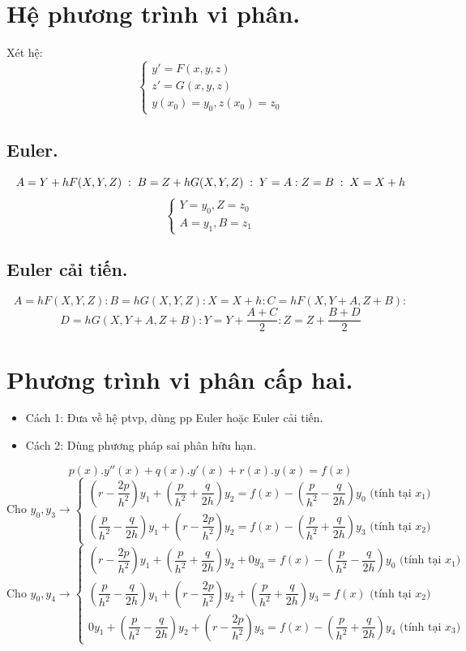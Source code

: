 \documentclass[12pt, a4paper]{report}
\begin{document}
\section{Hệ phương trình vi phân.}
Xét hệ:
\[
    \begin{cases}
        y' = F(x,y,z) \\
        z' = G(x,y,z) \\
        y(x_0) = y_0, z(x_0) = z_0
    \end{cases}    
\]
\subsection{Euler.}
\[
    A = Y + hF(X,Y,Z) \thickspace : \thickspace B = Z + hG(X,Y,Z) \thickspace : \thickspace Y = A : Z = B \thickspace : \thickspace X = X + h 
\]
\[
    \begin{cases}
        Y = y_0, Z = z_0 \\
        A = y_1, B = z_1
    \end{cases}
\]
\subsection{Euler cải tiến.}
\[
    A = hF(X,Y,Z)  :  B = hG(X,Y,Z)  :  X = X + h  :  C = hF(X,Y+A,Z+B) :
\]
\[
    D = hG(X,Y+A,Z+B) : Y = Y + \frac{A+C}{2} : Z = Z + \frac{B+D}{2}
\]
\section{Phương trình vi phân cấp hai.}
\begin{itemize}
    \item Cách 1: Đưa về hệ ptvp, dùng pp Euler hoặc Euler cải tiến.
    \item Cách 2: Dùng phương pháp sai phân hữu hạn.
\end{itemize}
\[
    p(x).y''(x) + q(x).y'(x) + r(x).y(x) = f(x)    
\]
\[
  \text{Cho } y_0, y_3 \longrightarrow  
    \begin{cases}
        \left( r - \dfrac{2p}{h^2} \right)y_1 + \left(\dfrac{p}{h^2} + \dfrac{q}{2h} \right)y_2 = f(x) - \left(\dfrac{p}{h^2} -\dfrac{q}{2h} \right)y_0 \text{ (tính tại } x_1) \\
        \left(\dfrac{p}{h^2} - \dfrac{q}{2h} \right)y_1 + \left( r - \dfrac{2p}{h^2} \right)y_2 = f(x) - \left(\dfrac{p}{h^2} + \dfrac{q}{2h} \right)y_3 \text{ (tính tại } x_2)
    \end{cases}    
\]
\[
    \text{Cho } y_0, y_4 \longrightarrow  
    \begin{cases}
        \left( r - \dfrac{2p}{h^2} \right)y_1 + \left(\dfrac{p}{h^2} + \dfrac{q}{2h} \right)y_2 + 0y_3 = f(x) - \left(\dfrac{p}{h^2} - \dfrac{q}{2h} \right)y_0 \text{ (tính tại } x_1) \\
        \left(\dfrac{p}{h^2} - \dfrac{q}{2h} \right)y_1 + \left( r - \dfrac{2p}{h^2} \right)y_2 + \left(\dfrac{p}{h^2} + \dfrac{q}{2h} \right)y_3 = f(x) \text{ (tính tại } x_2) \\
        0y_1 + \left(\dfrac{p}{h^2} - \dfrac{q}{2h} \right)y_2 + \left( r - \dfrac{2p}{h^2} \right)y_3 = f(x) - \left(\dfrac{p}{h^2} + \dfrac{q}{2h} \right)y_4 \text{ (tính tại } x_3)
    \end{cases}
\]
\end{document}
